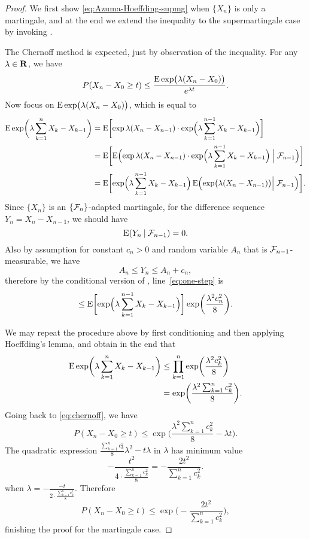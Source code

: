 \begin{proof}
    We first show \eqref{eq:Azuma-Hoeffding-supmg} when $\{X_n\}$ is only a martingale, and at the end we extend the inequality to the supermartingale case by invoking .
    
    The Chernoff method is expected, just by observation of the inequality. For any $\lambda \in\mathbf{R}$, we have 
\begin{equation}
P(X_{n}-X_{0}\geq t)\leq\frac{\E\exp\bigl(\lambda (X_{n}-X_{0})\bigr)}{e^{\lambda t}}.\label{eq:chernoff}
\end{equation}
Now focus on $\mathop{}\!\mathrm{E}\exp\bigl(\lambda (X_{n}-X_{0})\bigr)$, which is equal to
\begin{align}
\E\exp\biggl(\lambda \sum_{k=1}^{n}X_{k}-X_{k-1}\biggr) & =\E\biggl[\exp \lambda (X_{n}-X_{n-1})\cdot\exp\Bigl(\lambda\sum_{k=1}^{n-1}X_{k}-X_{k-1}\Bigr)\biggr]\nonumber \\
 & =\E\biggl[\E\Bigl(\exp \lambda(X_{n}-X_{n-1})\cdot\exp\Bigl(\lambda \sum_{k=1}^{n-1}X_{k}-X_{k-1}\Bigr)\Bigm\vert\F_{n-1}\Bigr)\biggr]\nonumber \\
 & =\E\biggl[\exp\Bigl(\lambda \sum_{k=1}^{n-1}X_{k}-X_{k-1}\Bigr)\E\Bigl(\exp\bigl(\lambda(X_{n}-X_{n-1})\bigl)\Bigm\vert\F_{n-1}\Bigr)\biggr].\label{eq:one-step}
\end{align}
Since $\{X_{n}\}$ is an $\{\mathcal{F}_{n}\}$-adapted martingale, for the difference sequence $Y_{n}=X_{n}-X_{n-1}$, we should have 
\[
\mathop{}\!\mathrm{E}(Y_{n}\mathbin{|}\mathcal{F}_{n-1}) = 0.
\]
Also by assumption for constant $c_{n}>0$ and random variable
$A_{n}$ that is $\mathcal{F}_{n-1}$-measurable, we have 
\[
A_{n}\leq Y_{n}\leq A_{n}+c_{n},
\]
therefore by the conditional version of , line~\eqref{eq:one-step} is 
\[
\leq \mathop{}\!\mathrm{E}\biggl[\exp\Bigl(\lambda \sum_{k=1}^{n-1}X_{k}-X_{k-1}\Bigr)\biggr]
\exp\biggl(\frac{\lambda^{2}c_{n}^{2}}{8}\biggr).
\]

We may repeat the procedure above by first conditioning and then applying
Hoeffding's lemma, and obtain in the end that 
\begin{align*}
\mathop{}\!\mathrm{E}\exp\biggl(\lambda \sum_{k=1}^{n}X_{k}-X_{k-1}\biggr) & \leq \prod_{k=1}^{n}\exp\biggl(\frac{\lambda^{2}c_{k}^{2}}{8}\biggr)\\
 & =\exp\biggl(\frac{\lambda^{2}\sum_{k=1}^{n}c_{k}^{2}}{8}\biggr).
\end{align*}
Going back to \eqref{eq:chernoff}, we have 
\[
P(X_{n}-X_{0}\geq t) \leq \exp\biggl(\frac{\lambda^{2}\sum_{k=1}^{n}c_{k}^{2}}{8}-\lambda t\biggr).
\]
The quadratic expression $\frac{\sum_{k=1}^{n}c_{k}^{2}}{8}\lambda^{2}-t\lambda$ in $\lambda$ has minimum value 
\[
-\frac{t^{2}}{4\cdot\frac{\sum_{k=1}^{n}c_{k}^{2}}{8}}=-\frac{2t^{2}}{\sum_{k=1}^{n}c_{k}^{2}}.
\] when $\lambda =-\frac{-t}{2\cdot\frac{\sum_{k=1}^{n}c_{k}^{2}}{8}}$.
Therefore 
\[
P(X_{n}-X_{0}\geq t)\leq\exp\biggl(-\frac{2t^{2}}{\sum_{k=1}^{n}c_{k}^{2}}\biggr),
\]
finishing the proof for the martingale case.


\end{proof}
